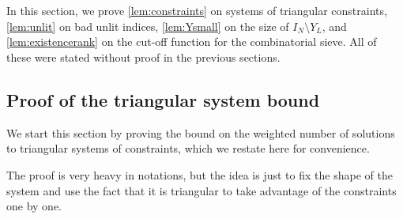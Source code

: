 \documentclass[11pt]{amsart}
\theoremstyle{definition}
\newcommand{\N}{I_N}
\newcommand{\elln}{L}
\newcommand{\Y}{Y_{\!\elln}}
\begin{document}

\section{}
\label{sec:combinatorial}


In this section, we prove \cref{lem:constraints} on systems of triangular constraints, \cref{lem:unlit} on bad unlit indices, \cref{lem:Ysmall} on the size of $\N\setminus \Y$, and \cref{lem:existencerank} on the cut-off function for the combinatorial sieve. All of these were stated without proof in the previous sections.


\subsection{Proof of the triangular system bound}

We start this section by proving the bound on the weighted number of solutions to triangular systems of constraints, which we restate here for convenience. 

\constraints*

The proof is very heavy in notations, but the idea is just to fix the shape of the system and use the fact that it is triangular to take advantage of the constraints one by one.
\end{document}
